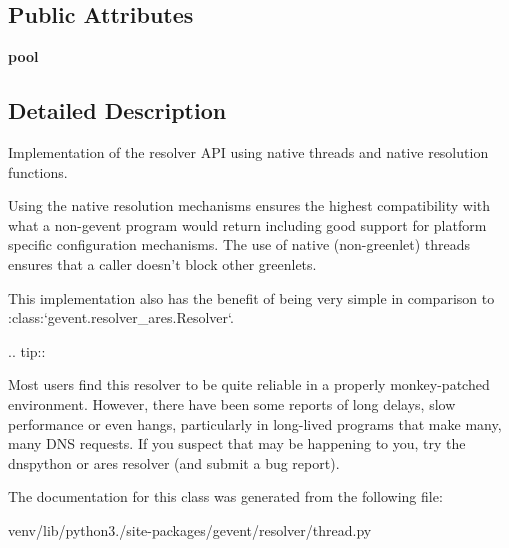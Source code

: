 \subsection*{Public Attributes}
\begin{DoxyCompactItemize}
\item 
\mbox{\label{classgevent_1_1resolver_1_1thread_1_1_resolver_abcb803c2d9b887901ec5c020bdcd44d9}} 
{\bfseries pool}
\end{DoxyCompactItemize}


\subsection{Detailed Description}
\begin{DoxyVerb}Implementation of the resolver API using native threads and native resolution
functions.

Using the native resolution mechanisms ensures the highest
compatibility with what a non-gevent program would return
including good support for platform specific configuration
mechanisms. The use of native (non-greenlet) threads ensures that
a caller doesn't block other greenlets.

This implementation also has the benefit of being very simple in comparison to
:class:`gevent.resolver_ares.Resolver`.

.. tip::

    Most users find this resolver to be quite reliable in a
    properly monkey-patched environment. However, there have been
    some reports of long delays, slow performance or even hangs,
    particularly in long-lived programs that make many, many DNS
    requests. If you suspect that may be happening to you, try the
    dnspython or ares resolver (and submit a bug report).
\end{DoxyVerb}
 

The documentation for this class was generated from the following file\+:\begin{DoxyCompactItemize}
\item 
venv/lib/python3./site-\/packages/gevent/resolver/thread.\+py\end{DoxyCompactItemize}
